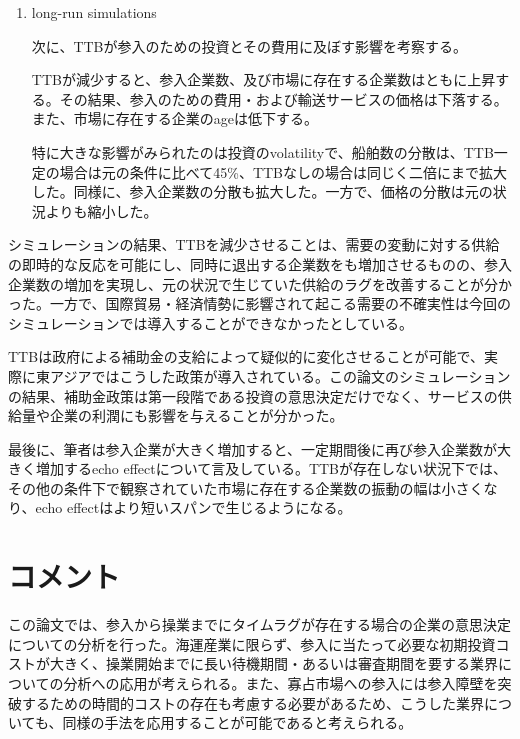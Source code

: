 \documentclass[11pt]{jsarticle}
\begin{document}
\begin{enumerate}
\begin{enumerate}
    \item long-run simulations

    次に、TTBが参入のための投資とその費用に及ぼす影響を考察する。

    TTBが減少すると、参入企業数、及び市場に存在する企業数はともに上昇する。その結果、参入のための費用・および輸送サービスの価格は下落する。また、市場に存在する企業のageは低下する。

    特に大きな影響がみられたのは投資のvolatilityで、船舶数の分散は、TTB一定の場合は元の条件に比べて45\%、TTBなしの場合は同じく二倍にまで拡大した。同様に、参入企業数の分散も拡大した。一方で、価格の分散は元の状況よりも縮小した。

    \end{enumerate}

    シミュレーションの結果、TTBを減少させることは、需要の変動に対する供給の即時的な反応を可能にし、同時に退出する企業数をも増加させるものの、参入企業数の増加を実現し、元の状況で生じていた供給のラグを改善することが分かった。一方で、国際貿易・経済情勢に影響されて起こる需要の不確実性は今回のシミュレーションでは導入することができなかったとしている。

    TTBは政府による補助金の支給によって疑似的に変化させることが可能で、実際に東アジアではこうした政策が導入されている。この論文のシミュレーションの結果、補助金政策は第一段階である投資の意思決定だけでなく、サービスの供給量や企業の利潤にも影響を与えることが分かった。

    最後に、筆者は参入企業が大きく増加すると、一定期間後に再び参入企業数が大きく増加するecho effectについて言及している。TTBが存在しない状況下では、その他の条件下で観察されていた市場に存在する企業数の振動の幅は小さくなり、echo effectはより短いスパンで生じるようになる。

\end{enumerate}

\section{コメント}

この論文では、参入から操業までにタイムラグが存在する場合の企業の意思決定についての分析を行った。海運産業に限らず、参入に当たって必要な初期投資コストが大きく、操業開始までに長い待機期間・あるいは審査期間を要する業界についての分析への応用が考えられる。また、寡占市場への参入には参入障壁を突破するための時間的コストの存在も考慮する必要があるため、こうした業界についても、同様の手法を応用することが可能であると考えられる。
\end{document}
